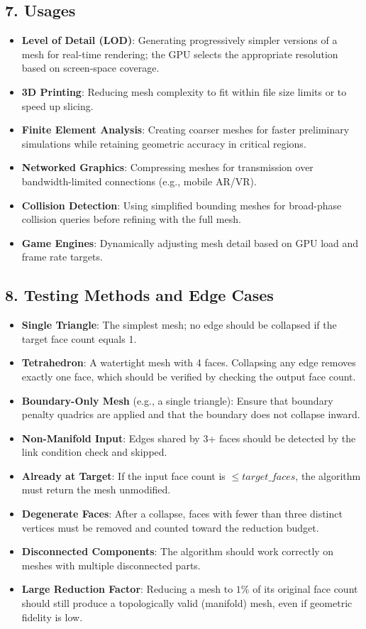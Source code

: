 \subsection{7. Usages}

\begin{itemize}
    \item \textbf{Level of Detail (LOD)}: Generating progressively simpler versions of a mesh for real-time rendering; the GPU selects the appropriate resolution based on screen-space coverage.
    \item \textbf{3D Printing}: Reducing mesh complexity to fit within file size limits or to speed up slicing.
    \item \textbf{Finite Element Analysis}: Creating coarser meshes for faster preliminary simulations while retaining geometric accuracy in critical regions.
    \item \textbf{Networked Graphics}: Compressing meshes for transmission over bandwidth-limited connections (e.g., mobile AR/VR).
    \item \textbf{Collision Detection}: Using simplified bounding meshes for broad-phase collision queries before refining with the full mesh.
    \item \textbf{Game Engines}: Dynamically adjusting mesh detail based on GPU load and frame rate targets.
\end{itemize}

\subsection{8. Testing Methods and Edge Cases}

\begin{itemize}
    \item \textbf{Single Triangle}: The simplest mesh; no edge should be collapsed if the target face count equals 1.
    \item \textbf{Tetrahedron}: A watertight mesh with 4 faces. Collapsing any edge removes exactly one face, which should be verified by checking the output face count.
    \item \textbf{Boundary-Only Mesh} (e.g., a single triangle): Ensure that boundary penalty quadrics are applied and that the boundary does not collapse inward.
    \item \textbf{Non-Manifold Input}: Edges shared by 3+ faces should be detected by the link condition check and skipped.
    \item \textbf{Already at Target}: If the input face count is $\leq target\_faces$, the algorithm must return the mesh unmodified.
    \item \textbf{Degenerate Faces}: After a collapse, faces with fewer than three distinct vertices must be removed and counted toward the reduction budget.
    \item \textbf{Disconnected Components}: The algorithm should work correctly on meshes with multiple disconnected parts.
    \item \textbf{Large Reduction Factor}: Reducing a mesh to $1\%$ of its original face count should still produce a topologically valid (manifold) mesh, even if geometric fidelity is low.
\end{itemize}

